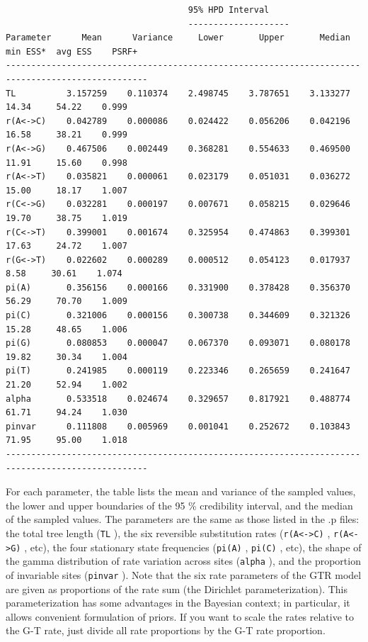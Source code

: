 \documentclass[12pt]{book}
\newcommand{\ttt}[1]{\texttt{#1} }
\begin{document}
\begin{singlespacing}
\scriptsize
\begin{verbatim}
                                    95% HPD Interval
                                    --------------------
Parameter      Mean      Variance     Lower       Upper       Median    min ESS*  avg ESS    PSRF+ 
--------------------------------------------------------------------------------------------------
TL          3.157259    0.110374    2.498745    3.787651    3.133277     14.34     54.22    0.999
r(A<->C)    0.042789    0.000086    0.024422    0.056206    0.042196     16.58     38.21    0.999
r(A<->G)    0.467506    0.002449    0.368281    0.554633    0.469500     11.91     15.60    0.998
r(A<->T)    0.035821    0.000061    0.023179    0.051031    0.036272     15.00     18.17    1.007
r(C<->G)    0.032281    0.000197    0.007671    0.058215    0.029646     19.70     38.75    1.019
r(C<->T)    0.399001    0.001674    0.325954    0.474863    0.399301     17.63     24.72    1.007
r(G<->T)    0.022602    0.000289    0.000512    0.054123    0.017937      8.58     30.61    1.074
pi(A)       0.356156    0.000166    0.331900    0.378428    0.356370     56.29     70.70    1.009
pi(C)       0.321006    0.000156    0.300738    0.344609    0.321326     15.28     48.65    1.006
pi(G)       0.080853    0.000047    0.067370    0.093071    0.080178     19.82     30.34    1.004
pi(T)       0.241985    0.000119    0.223346    0.265659    0.241647     21.20     52.94    1.002
alpha       0.533518    0.024674    0.329657    0.817921    0.488774     61.71     94.24    1.030
pinvar      0.111808    0.005969    0.001041    0.252672    0.103843     71.95     95.00    1.018
--------------------------------------------------------------------------------------------------
\end{verbatim}
\normalsize
\end{singlespacing}

For each parameter, the table lists the mean and variance of the sampled values, the lower and
upper boundaries of the 95 \% credibility interval, and the median of the sampled values. The
parameters are the same as those listed in the .p files: the total tree length (\ttt{TL}), the
six reversible substitution rates (\ttt{r(A<->C)}, \ttt{r(A<->G)}, etc), the four stationary
state frequencies (\ttt{pi(A)}, \ttt{pi(C)}, etc), the shape of the gamma distribution of
rate variation across sites (\ttt{alpha}), and the proportion of invariable sites
(\ttt{pinvar}). Note that the six rate parameters of the GTR model are given as proportions of
the rate sum (the Dirichlet parameterization). This parameterization has some advantages in the
Bayesian context; in particular, it allows convenient formulation of priors. If you want to scale
the rates relative to the G-T rate, just divide all rate proportions by the G-T rate proportion.
\end{document}
